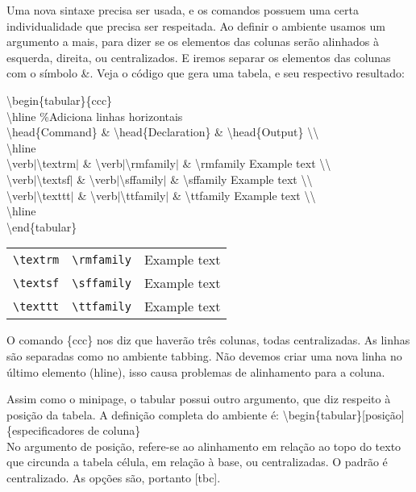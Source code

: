 Uma nova sintaxe precisa ser usada, e os comandos possuem uma certa
individualidade que precisa ser respeitada. Ao definir o ambiente usamos um
argumento a mais, para dizer se os elementos das colunas serão alinhados à
esquerda, direita, ou centralizados. E iremos separar os elementos das colunas
com o símbolo \&. Veja o código que gera uma tabela, e seu respectivo
resultado:

\noindent\textbackslash begin\{tabular\}\{ccc\} \\
	\textbackslash hline \%Adiciona linhas horizontais\\
	\textbackslash head\{Command\} \& \textbackslash head\{Declaration\} \& \textbackslash head\{Output\} \textbackslash \textbackslash \\
	\textbackslash hline\\
	\textbackslash verb$|$\textbackslash textrm$|$ \& \textbackslash verb$|$\textbackslash rmfamily$|$ \& \textbackslash rmfamily Example text \textbackslash \textbackslash \\
	\textbackslash verb$|$\textbackslash textsf$|$ \& \textbackslash verb$|$\textbackslash sffamily$|$ \& \textbackslash sffamily Example text \textbackslash \textbackslash \\
	\textbackslash verb$|$\textbackslash texttt$|$ \& \textbackslash verb$|$\textbackslash ttfamily$|$ \& \textbackslash ttfamily Example text \textbackslash \textbackslash \\
	\textbackslash hline\\
\textbackslash end\{tabular\}\\

\begin{tabular}{ccc}
	\hline %
	\head{Command} & \head{Declaration} & \head{Output} \\
	\hline
	\verb|\textrm| & \verb|\rmfamily| & \rmfamily Example text \\
	\verb|\textsf| & \verb|\sffamily| & \sffamily Example text \\
	\verb|\texttt| & \verb|\ttfamily| & \ttfamily Example text \\
	\hline
\end{tabular}

O comando \{ccc\} nos diz que haverão três colunas, todas centralizadas. As
linhas são separadas como no ambiente tabbing. Não devemos criar uma nova linha
no último elemento (hline), isso causa problemas de alinhamento para a coluna.

Assim como o minipage, o tabular possui outro argumento, que diz respeito à
posição da tabela. A definição completa do ambiente é: \newline
\noindent\textbackslash begin\{tabular\}[posição]\{especificadores de coluna\} \\\indent
No argumento de posição, refere-se ao alinhamento em relação ao topo do texto que circunda a tabela
célula, em relação à base, ou centralizadas. O padrão é centralizado. As opções
são, portanto [tbc].

